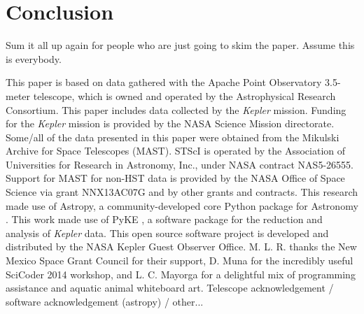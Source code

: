 \section{Conclusion}\label{conclude}
Sum it all up again for people who are just going to skim the paper. Assume this is everybody.

\acknowledgments
This paper is based on data gathered with the Apache Point Observatory 3.5-meter telescope, which is owned and operated by the Astrophysical Research Consortium. This paper includes data collected by the \emph{Kepler} mission. Funding for the \emph{Kepler} mission is provided by the NASA Science Mission directorate. Some/all of the data presented in this paper were obtained from the Mikulski Archive for Space Telescopes (MAST). STScI is operated by the Association of Universities for Research in Astronomy, Inc., under NASA contract NAS5-26555. Support for MAST for non-HST data is provided by the NASA Office of Space Science via grant NNX13AC07G and by other grants and contracts. This research made use of Astropy, a community-developed core Python package for Astronomy \citep{astropy}. This work made use of PyKE \citep{pyke}, a software package for the reduction and analysis of \emph{Kepler} data. This open source software project is developed and distributed by the NASA Kepler Guest Observer Office.
M. L. R. thanks the New Mexico Space Grant Council for their support, D. Muna for the incredibly useful SciCoder 2014 workshop, and L. C. Mayorga for a delightful mix of programming assistance and aquatic animal whiteboard art.
Telescope acknowledgement / software acknowledgement (astropy) / other... 